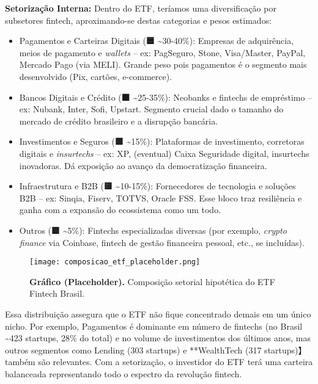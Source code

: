\documentclass[12pt]{article}
\begin{document}
\textbf{Setorização Interna:} Dentro do ETF, teríamos uma diversificação por subsetores fintech, aproximando-se destas categorias e pesos estimados:
\begin{itemize}
\item Pagamentos e Carteiras Digitais (\textbf{🟦} \textasciitilde30-40\%): Empresas de adquirência, meios de pagamento e \textit{wallets} – ex: PagSeguro, Stone, Visa/Master, PayPal, Mercado Pago (via MELI). Grande peso pois pagamentos é o segmento mais desenvolvido (Pix, cartões, e-commerce).
\item Bancos Digitais e Crédito (\textbf{🟧} \textasciitilde25-35\%): Neobanks e fintechs de empréstimo – ex: Nubank, Inter, Sofi, Upstart. Segmento crucial dado o tamanho do mercado de crédito brasileiro e a disrupção bancária.
\item Investimentos e Seguros (\textbf{🟩} \textasciitilde15\%): Plataformas de investimento, corretoras digitais e \textit{insurtechs} – ex: XP, (eventual) Caixa Seguridade digital, insurtechs inovadoras. Dá exposição ao avanço da democratização financeira.
\item Infraestrutura e B2B (\textbf{🟨} \textasciitilde10-15\%): Fornecedores de tecnologia e soluções B2B – ex: Sinqia, Fiserv, TOTVS, Oracle FSS. Esse bloco traz resiliência e ganha com a expansão do ecossistema como um todo.
\item Outros (\textbf{🟪} \textasciitilde5\%): Fintechs especializadas diversas (por exemplo, \textit{crypto finance} via Coinbase, fintech de gestão financeira pessoal, etc., se incluídas).
\end{itemize}

\begin{figure}[!h]
\centering
\texttt{[image: composicao\_etf\_placeholder.png]}
\caption{\textbf{Gráfico (Placeholder).} Composição setorial hipotética do ETF Fintech Brasil.}
\label{fig:composicaoETF}
\end{figure}

Essa distribuição assegura que o ETF não fique concentrado demais em um único nicho. Por exemplo, Pagamentos é dominante em número de fintechs (no Brasil \textasciitilde423 startups, 28\% do total) e no volume de investimentos dos últimos anos, mas outros segmentos como Lending (303 startups) e **WealthTech (317 startups)】 também são relevantes. Com a setorização, o investidor do ETF terá uma carteira balanceada representando todo o espectro da revolução fintech.
\end{document}
